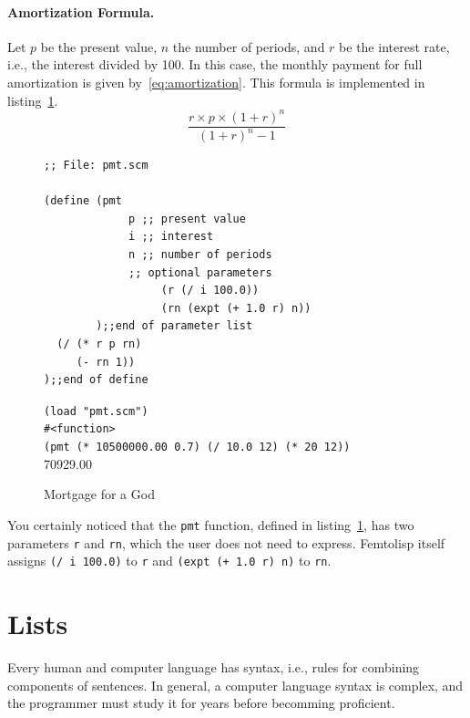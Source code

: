 \documentclass[a4paper,12pt]{book}
\newenvironment{fmpage}[1]
               {\begin{lrbox}{\fmbox}\begin{minipage}{#1}}
               {\end{minipage}\end{lrbox}\fbox{\usebox{\fmbox}}}
\begin{document}
\paragraph{Amortization Formula.} Let $p$ be the
present value, $n$ the number of periods,
and $r$ be the
interest rate, i.e., the interest divided by 100.
In this case, the monthly payment for full
amortization is given by~\ref{eq:amortization}.
This formula is implemented in
listing~\ref{Pan:mortgage}.
\begin{equation}
\frac{r\times p\times(1+r)^n}{(1+r)^n - 1}
\label{eq:amortization}
\end{equation}

\begin{figure}[!h]
\begin{fmpage}{0.9\textwidth}
\begin{verbatim}
;; File: pmt.scm

(define (pmt 
             p ;; present value
             i ;; interest 
             n ;; number of periods
             ;; optional parameters
                  (r (/ i 100.0)) 
                  (rn (expt (+ 1.0 r) n)) 
        );;end of parameter list
  (/ (* r p rn)
     (- rn 1))
);;end of define

\end{verbatim}
\end{fmpage}

\begin{fmpage}{0.9\textwidth}
  \verb|(load "pmt.scm")|\\
  \verb|#<function>|\\
  \verb|(pmt (* 10500000.00 0.7) (/ 10.0 12) (* 20 12))|\\
  70929.00
\end{fmpage}
\caption{Mortgage for a God}
\label{Pan:mortgage}
\end{figure}

You certainly noticed that the
\verb|pmt| function, defined
in listing~\ref{Pan:mortgage},
has two parameters \verb|r| and \verb|rn|,
which the user does not need
to express. Femtolisp itself
assigns \verb|(/ i 100.0)| to \verb|r|
and \verb|(expt (+ 1.0 r) n)| to \verb|rn|.

\section{Lists}
Every human and computer language
has syntax, i.e., rules for combining
components of sentences.
In general, a computer language
syntax is complex, and the programmer
must study it for years before
becomming proficient.
\end{document}
